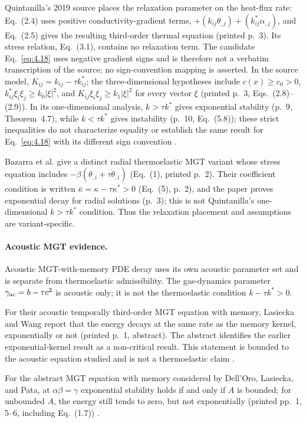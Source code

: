 Quintanilla's 2019 source places the relaxation parameter on the heat-flux rate: Eq.~(2.4) uses positive conductivity-gradient terms, $+(k_{ij}\theta_{,j})+(k^*_{ij}\alpha_{,j})$, and Eq.~(2.5) gives the resulting third-order thermal equation (printed p.~3). Its stress relation, Eq.~(3.1), contains no relaxation term. The candidate Eq.~\eqref{eq:4.18} uses negative gradient signs and is therefore not a verbatim transcription of the source; no sign-convention mapping is asserted. In the source model, $K_{ij}=k_{ij}-\tau k^*_{ij}$; the three-dimensional hypotheses include $c(x)\geq c_0>0$, $k^*_{ij}\xi_i\xi_j\geq k_0|\xi|^2$, and $K_{ij}\xi_i\xi_j\geq k_1|\xi|^2$ for every vector $\xi$ (printed p.~3, Eqs.~(2.8)--(2.9)). In its one-dimensional analysis, $k>\tau k^*$ gives exponential stability (p.~9, Theorem~4.7), while $k<\tau k^*$ gives instability (p.~10, Eq.~(5.8)); these strict inequalities do not characterize equality or establish the same result for Eq.~\eqref{eq:4.18} with its different sign convention \cite{Quintanilla2019}.

Bazarra et al. give a distinct radial thermoelastic MGT variant whose stress equation includes $-\beta(\theta_{,i}+\tau\dot{\theta}_{,i})$ (Eq.~(1), printed p.~2). Their coefficient condition is written $\bar{\kappa}=\kappa-\tau\kappa^*>0$ (Eq.~(5), p.~2), and the paper proves exponential decay for radial solutions (p.~3); this is not Quintanilla's one-dimensional $k>\tau k^*$ condition. Thus the relaxation placement and assumptions are variant-specific.

\paragraph{Acoustic MGT evidence.} Acoustic MGT-with-memory PDE decay uses its own acoustic parameter set and is separate from thermoelastic admissibility. The gas-dynamics parameter $\gamma_{\rm ac}=b-\tau c^2$ is acoustic only; it is not the thermoelastic condition $k-\tau k^*>0$.

For their acoustic temporally third-order MGT equation with memory, Lasiecka and Wang report that the energy decays at the same rate as the memory kernel, exponentially or not (printed p.~1, abstract). The abstract identifies the earlier exponential-kernel result as a non-critical result. This statement is bounded to the acoustic equation studied and is not a thermoelastic claim \cite{LasieckaWang2015MGT}.

For the abstract MGT equation with memory considered by Dell'Oro, Lasiecka, and Pata, at $\alpha\beta=\gamma$ exponential stability holds if and only if $A$ is bounded; for unbounded $A$, the energy still tends to zero, but not exponentially (printed pp.~1, 5--6, including Eq.~(1.7)) \cite{DellOroLasieckaPata2016MGT}.


